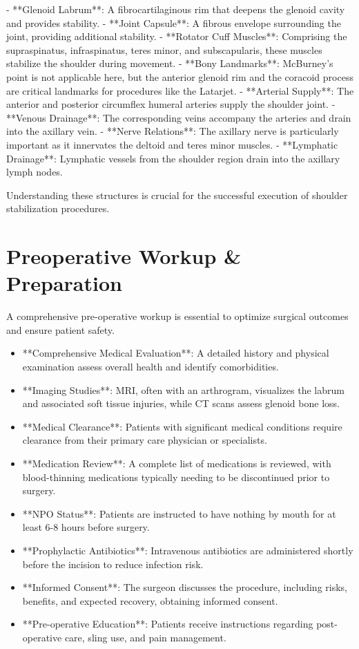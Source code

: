 - **Glenoid Labrum**: A fibrocartilaginous rim that deepens the glenoid cavity and provides stability.
- **Joint Capsule**: A fibrous envelope surrounding the joint, providing additional stability.
- **Rotator Cuff Muscles**: Comprising the supraspinatus, infraspinatus, teres minor, and subscapularis, these muscles stabilize the shoulder during movement.
- **Bony Landmarks**: McBurney's point is not applicable here, but the anterior glenoid rim and the coracoid process are critical landmarks for procedures like the Latarjet.
- **Arterial Supply**: The anterior and posterior circumflex humeral arteries supply the shoulder joint.
- **Venous Drainage**: The corresponding veins accompany the arteries and drain into the axillary vein.
- **Nerve Relations**: The axillary nerve is particularly important as it innervates the deltoid and teres minor muscles.
- **Lymphatic Drainage**: Lymphatic vessels from the shoulder region drain into the axillary lymph nodes.

Understanding these structures is crucial for the successful execution of shoulder stabilization procedures.

\section*{Preoperative Workup \& Preparation}
A comprehensive pre-operative workup is essential to optimize surgical outcomes and ensure patient safety. 

\begin{itemize}
  \item **Comprehensive Medical Evaluation**: A detailed history and physical examination assess overall health and identify comorbidities.
  \item **Imaging Studies**: MRI, often with an arthrogram, visualizes the labrum and associated soft tissue injuries, while CT scans assess glenoid bone loss.
  \item **Medical Clearance**: Patients with significant medical conditions require clearance from their primary care physician or specialists.
  \item **Medication Review**: A complete list of medications is reviewed, with blood-thinning medications typically needing to be discontinued prior to surgery.
  \item **NPO Status**: Patients are instructed to have nothing by mouth for at least 6-8 hours before surgery.
  \item **Prophylactic Antibiotics**: Intravenous antibiotics are administered shortly before the incision to reduce infection risk.
  \item **Informed Consent**: The surgeon discusses the procedure, including risks, benefits, and expected recovery, obtaining informed consent.
  \item **Pre-operative Education**: Patients receive instructions regarding post-operative care, sling use, and pain management.
\end{itemize}

